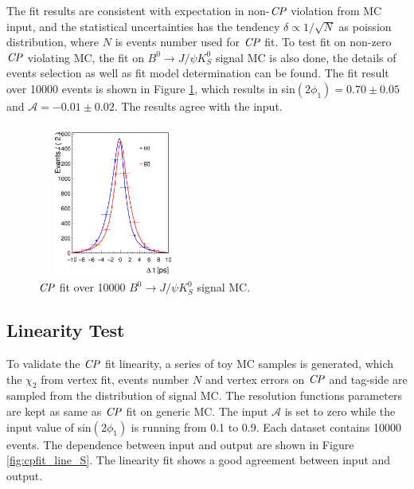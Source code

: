 The fit results are consistent with expectation in non-$\it{CP}$ violation from MC input, and the statistical uncertainties has the tendency $\delta \propto 1/\sqrt{N}$ as poission distribution, where $N$ is events number used for $\it{CP}$ fit. To test fit on non-zero $\it{CP}$ violating MC, the fit on $B^0\to J/\psi K_S^0$ signal MC is also done, the details of events selection as well as fit model determination can be found\cite{jpsiks_ichep}. The fit result over 10000 events is shown in Figure \ref{fig:cpfit_jpsiks}, which results in sin$(2\phi_1) = 0.70 \pm 0.05 $ and $\mathcal{A} = -0.01\pm 0.02$. The results agree with the input.
\begin{figure}[H]
	\centering
	\includegraphics[height=5cm,width=5cm]{figures/jpsiks_cpfit10000}
	\caption{$\it{CP}$ fit over 10000 $B^0\to J/\psi K_S^0$ signal MC. }
	\label{fig:cpfit_jpsiks}
\end{figure}

\subsection{Linearity Test}
To validate the $\it{CP}$ fit linearity, a series of toy MC samples is generated, which the $\chi_2$ from vertex fit, events number $N$ and vertex errors on $\it{CP}$ and tag-side are sampled from the distribution of signal MC. The resolution functions parameters are kept as same as $\it{CP}$ fit on generic MC. The input $\mathcal{A}$ is set to zero while the input value of sin$(2\phi_1)$ is running from 0.1 to 0.9. Each dataset contains 10000 events. The dependence between input and output are shown in Figure \ref{fig:cpfit_line_S}. The linearity fit shows a good agreement between input and output.

